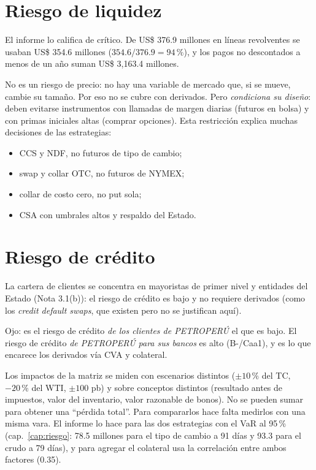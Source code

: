 \section{Riesgo de liquidez}

El informe lo califica de crítico. De US\$ 376.9 millones en líneas revolventes se usaban US\$ 354.6 millones ($354.6/376.9=94\,\%$), y los pagos no descontados a menos de un año suman US\$ 3,163.4 millones.

No es un riesgo de precio: no hay una variable de mercado que, si se mueve, cambie su tamaño. Por eso no se cubre con derivados. Pero \emph{condiciona su diseño}: deben evitarse instrumentos con llamadas de margen diarias (futuros en bolsa) y con primas iniciales altas (comprar opciones). Esta restricción explica muchas decisiones de las estrategias:
\begin{itemize}
\item CCS y NDF, no futuros de tipo de cambio;
\item swap y collar OTC, no futuros de NYMEX;
\item collar de costo cero, no put sola;
\item CSA con umbrales altos y respaldo del Estado.
\end{itemize}

\section{Riesgo de crédito}

La cartera de clientes se concentra en mayoristas de primer nivel y entidades del Estado (Nota 3.1(b)): el riesgo de crédito es bajo y no requiere derivados (como los \emph{credit default swaps}, que existen pero no se justifican aquí).

Ojo: es el riesgo de crédito \emph{de los clientes de PETROPERÚ} el que es bajo. El riesgo de crédito \emph{de PETROPERÚ para sus bancos} es alto (B-/Caa1), y es lo que encarece los derivados vía CVA y colateral.

\begin{cuidado}
Los impactos de la matriz se miden con escenarios distintos ($\pm10\,\%$ del TC, $-20\,\%$ del WTI, $\pm100$ pb) y sobre conceptos distintos (resultado antes de impuestos, valor del inventario, valor razonable de bonos). No se pueden sumar para obtener una \enquote{pérdida total}. Para compararlos hace falta medirlos con una misma vara. El informe lo hace para las dos estrategias con el VaR al 95\,\% (cap.~\ref{cap:riesgo}: 78.5 millones para el tipo de cambio a 91 días y 93.3 para el crudo a 79 días), y para agregar el colateral usa la correlación entre ambos factores (0.35).
\end{cuidado}


